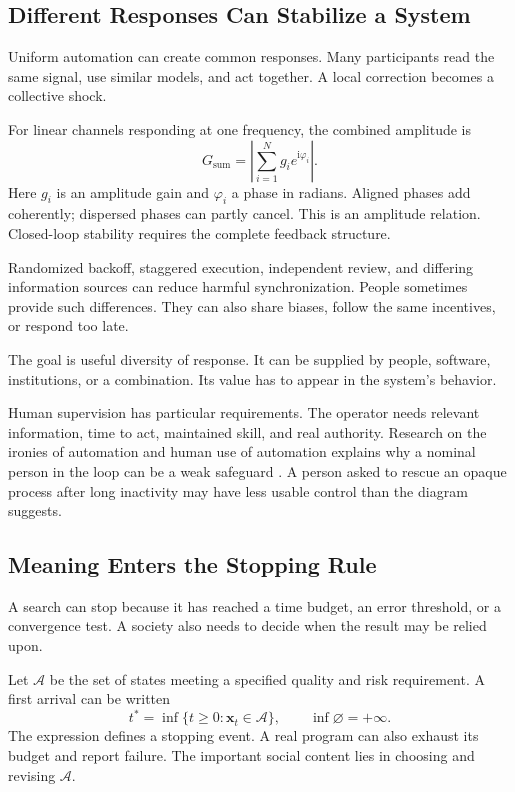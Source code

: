 \subsection{Different Responses Can Stabilize a System}

Uniform automation can create common responses. Many participants read the same signal, use similar models, and act together. A local correction becomes a collective shock.

For linear channels responding at one frequency, the combined amplitude is
\begin{equation}
 G_{\mathrm{sum}}=
 \left|\sum_{i=1}^{N}g_i e^{\mathrm{i}\varphi_i}\right|.
\end{equation}
Here $g_i$ is an amplitude gain and $\varphi_i$ a phase in radians. Aligned phases add coherently; dispersed phases can partly cancel. This is an amplitude relation. Closed-loop stability requires the complete feedback structure.

Randomized backoff, staggered execution, independent review, and differing information sources can reduce harmful synchronization. People sometimes provide such differences. They can also share biases, follow the same incentives, or respond too late.

The goal is useful diversity of response. It can be supplied by people, software, institutions, or a combination. Its value has to appear in the system's behavior.

Human supervision has particular requirements. The operator needs relevant information, time to act, maintained skill, and real authority. Research on the ironies of automation and human use of automation explains why a nominal person in the loop can be a weak safeguard \cite{bainbridge1983ironies,parasuraman1997humans}. A person asked to rescue an opaque process after long inactivity may have less usable control than the diagram suggests.

\subsection{Meaning Enters the Stopping Rule}

A search can stop because it has reached a time budget, an error threshold, or a convergence test. A society also needs to decide when the result may be relied upon.

Let $\mathcal A$ be the set of states meeting a specified quality and risk requirement. A first arrival can be written
\begin{equation}
 t^\ast=\inf\{t\geq0:\mathbf{x}_t\in\mathcal A\},
 \qquad \inf\varnothing=+\infty.
\end{equation}
The expression defines a stopping event. A real program can also exhaust its budget and report failure. The important social content lies in choosing and revising $\mathcal A$.

